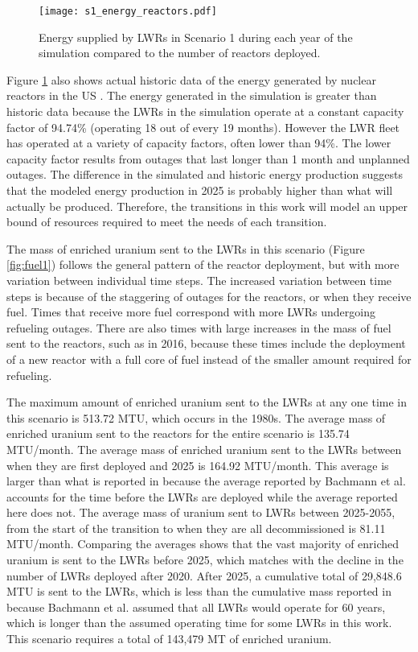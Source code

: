 \begin{figure}
    \centering
    \texttt{[image: s1\_energy\_reactors.pdf]}
    \caption{Energy supplied by \glspl{LWR} in Scenario 1 during each year of
    the simulation compared to the number of reactors deployed.}
    \label{fig:energy_reactor1}
\end{figure}

Figure \ref{fig:energy_reactor1} also shows actual historic data of the 
energy generated by nuclear reactors in the US \cite{noauthor_total_2022}.
The energy generated in the simulation is greater than historic 
data because the \glspl{LWR} in the simulation operate at a constant 
capacity factor of 94.74\% (operating 18 out of every 19 months). However 
the \gls{LWR} fleet has operated at a variety of capacity factors, often 
lower than 94\%. The lower capacity factor results from outages that last 
longer than 1 month and unplanned outages. The difference 
in the simulated and historic energy production suggests that the modeled 
energy production in 2025 is probably higher than what will actually 
be produced. Therefore, the transitions in this work will model an upper 
bound of resources required to meet the needs of each transition. 

The mass of enriched uranium sent to the \glspl{LWR} in this scenario (Figure 
\ref{fig:fuel1}) follows the general pattern of the reactor deployment, but with 
more variation between individual time steps. The increased variation between 
time steps is because of the staggering of outages for the reactors, or when 
they receive fuel. Times that receive more fuel correspond with more 
\glspl{LWR} undergoing refueling outages. There are also times with large 
increases in the mass of fuel 
sent to the reactors, such as in 2016, because these times include the deployment 
of a new reactor with a full core of fuel instead of the smaller amount 
required for refueling.

The maximum amount of enriched uranium sent to the \glspl{LWR} at any one 
time in this scenario is 513.72 MTU, which occurs in the 1980s. The 
average mass of enriched uranium sent to 
the reactors for the entire scenario is 135.74 MTU/month. The average mass of 
enriched uranium sent to the \glspl{LWR} between when they are first deployed 
and 2025 is 164.92 MTU/month. This average is larger than what is reported in 
\cite{bachmann_enrichment_2021} because the average reported by 
Bachmann et al. accounts for the time before the \glspl{LWR} are  
deployed while the average reported here does not. The average mass of 
uranium sent to \glspl{LWR} between 2025-2055, from the start of the transition 
to when they are all decommissioned is 81.11 MTU/month. Comparing the averages 
shows that the vast majority of enriched uranium is sent to the \glspl{LWR} 
before 2025, which matches with the decline in the number of \glspl{LWR} 
deployed after 2020. After 2025, a cumulative total of 29,848.6 MTU is 
sent to the \glspl{LWR},
which is less than the cumulative mass reported in \cite{bachmann_enrichment_2021}
because Bachmann et al. assumed that all \glspl{LWR} would operate for 60 years, 
which is longer than the assumed operating time for some \glspl{LWR} in 
this work. This scenario requires a total of 143,479 MT of enriched uranium.

